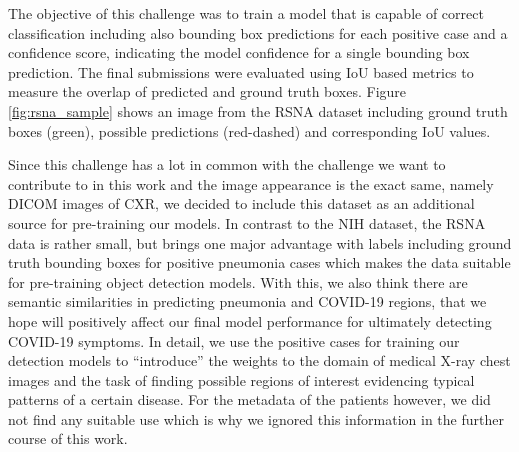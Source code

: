 The objective of this challenge was to train a model that is capable of correct classification including also bounding box predictions for each positive case and a confidence score, indicating the model confidence for a single bounding box prediction. The final submissions were evaluated using \ac{IoU} based metrics to measure the overlap of predicted and ground truth boxes. Figure \ref{fig:rsna_sample} shows an image from the \ac{RSNA} dataset including ground truth boxes (green), possible predictions (red-dashed) and corresponding \ac{IoU} values.

Since this challenge has a lot in common with the challenge we want to contribute to in this work and the image appearance is the exact same, namely DICOM images of \ac{CXR}, we decided to include this dataset as an additional source for pre-training our models. In contrast to the \ac{NIH} dataset, the \ac{RSNA} data is rather small, but brings one major advantage with labels including ground truth bounding boxes for positive pneumonia cases which makes the data suitable for pre-training object detection models. With this, we also think there are semantic similarities in predicting pneumonia and COVID-19 regions, that we hope will positively affect our final model performance for ultimately detecting COVID-19 symptoms. In detail, we use the positive cases for training our detection models to \enquote{introduce} the weights to the domain of medical X-ray chest images and the task of finding possible regions of interest evidencing typical patterns of a certain disease. For the metadata of the patients however, we did not find any suitable use which is why we ignored this information in the further course of this work.

